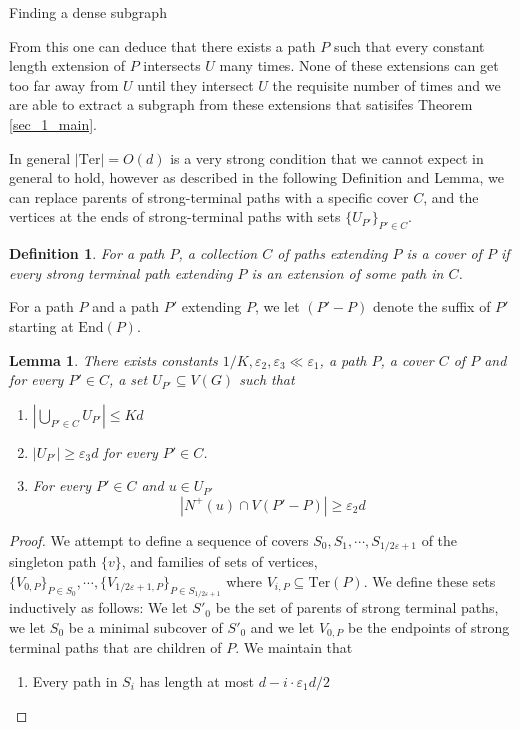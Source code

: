 \documentclass[11pt,a4paper]{article}
\newcounter{foo}
\newtheorem{lemma}[subsection]{Lemma}
\newtheorem{definition}[foo]{Definition}
\newcommand{\vep}{\varepsilon}
\newcommand{\End}{\mathrm{End}}
\newcommand{\Ter}{\mathrm{Ter}}
\begin{document}
\begin{section}{Finding a dense subgraph}
\medskip

From this one can deduce that there exists a path $P$ such that every constant length extension of $P$ intersects $U$ many times. None of these extensions can get too far away from $U$ until they intersect $U$ the requisite number of times and we are able to extract a subgraph from these extensions that satisifes Theorem \ref{sec_1_main}.

\medskip


In general $|\Ter| = O(d)$ is a very strong condition that we cannot expect in general to hold, however as described in the following Definition and Lemma, we can replace parents of strong-terminal paths with a specific cover $C$, and the vertices at the ends of strong-terminal paths with sets $ \{ U_{P' } \}_{P' \in C}$.
\begin{definition} For a path $P$, a collection $C$ of paths extending $P$ is a cover of $P$ if every strong terminal path extending $P$ is an extension of some path in $C$.
\end{definition}
For a path $P$ and a path $P'$ extending $P$, we let $(P' - P)$ denote the suffix of $P'$ starting at $\End(P)$.
\begin{lemma} \label{short_ends} There exists constants $1/K, \vep_2, \vep_3 \ll \vep_1$, a path $P$, a cover $C$ of $P$ and for every $P' \in C$, a set $U_{P'} \subseteq V(G)$ such that
\begin{enumerate}
\item[\textbf{D1}] $| \bigcup_{P' \in C} U_{P'} | \leq Kd$
\item[\textbf{D2}] $ |U_{P'} | \geq \vep_3 d$ for every $P' \in C$.
\item[\textbf{D3}] For every $P' \in C$ and $u \in U_{P'}$
\[ | N^{+} (u) \cap V(P' - P) | \geq \vep_2 d
\]
\end{enumerate}
\end{lemma}
\begin{proof} We attempt to define a sequence of covers $S_0, S_1, \cdots, S_{1/2\vep + 1}$ of the singleton path $\{v\}$, and families of sets of vertices, $ \{V_{0, P}\}_{P \in S_0}, \cdots, \{V_{1/2\vep + 1, P} \}_{P \in S_{1/2 \vep + 1}}$ where $ V_{i, P} \subseteq \Ter(P)$. We define these sets inductively as follows: We let $S'_0$ be the set of parents of strong terminal paths, we let $S_0$ be a minimal subcover of $S'_0$ and we let $V_{0, P}$ be the endpoints of strong terminal paths that are children of $P$. We maintain that
\begin{enumerate}
\item[$\textbf{C1}_i$] Every path in $S_i$ has length at most $d - i \cdot \vep_1 d /2 $

\end{enumerate}
\end{proof}
\end{section}
\end{document}
